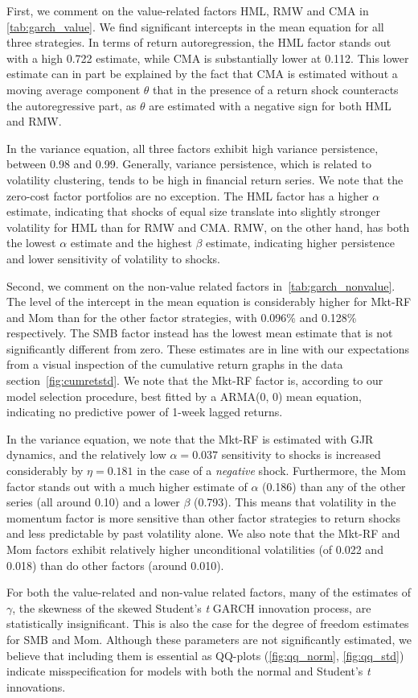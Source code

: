 First, we comment on the value-related factors HML, RMW and CMA in \autoref{tab:garch_value}. We find significant intercepts in the mean equation for all three strategies. In terms of return autoregression, the HML factor stands out with a high 0.722 estimate, while CMA is substantially lower at 0.112. This lower estimate can in part be explained by the fact that CMA is estimated without a moving average component $\theta$ that in the presence of a return shock counteracts the autoregressive part, as $\theta$ are estimated with a negative sign for both HML and RMW. 

In the variance equation, all three factors exhibit high variance persistence, between 0.98 and 0.99. Generally, variance persistence, which is related to volatility clustering, tends to be high in financial return series. We note that the zero-cost factor portfolios are no exception. The HML factor has a higher $\alpha$ estimate, indicating that shocks of equal size translate into slightly stronger volatility for HML than for RMW and CMA. RMW, on the other hand, has both the lowest $\alpha$ estimate and the highest $\beta$ estimate, indicating higher persistence and lower sensitivity of volatility to shocks.

Second, we comment on the non-value related factors in~\autoref{tab:garch_nonvalue}. The level of the intercept in the mean equation is considerably higher for Mkt-RF and Mom than for the other factor strategies, with 0.096\% and 0.128\% respectively. The SMB factor instead has the lowest mean estimate that is not significantly different from zero. These estimates are in line with our expectations from a visual inspection of the cumulative return graphs in the data section~\autoref{fig:cumretstd}. We note that the Mkt-RF factor is, according to our model selection procedure, best fitted by a ARMA(0, 0) mean equation, indicating no predictive power of 1-week lagged returns. 

In the variance equation, we note that the Mkt-RF is estimated with GJR dynamics, and the relatively low $\alpha = 0.037$ sensitivity to shocks is increased considerably by $\eta = 0.181$ in the case of a \emph{negative} shock. Furthermore, the Mom factor stands out with a much higher estimate of $\alpha$ (0.186) than any of the other series (all around 0.10) and a lower $\beta$ (0.793). This means that volatility in the momentum factor is more sensitive than other factor strategies to return shocks and less predictable by past volatility alone. We also note that the Mkt-RF and Mom factors exhibit relatively higher unconditional volatilities (of 0.022 and 0.018) than do other factors (around 0.010).

For both the value-related and non-value related factors, many of the estimates of $\gamma$, the skewness of the skewed Student's \textit{t} GARCH innovation process, are statistically insignificant. This is also the case for the degree of freedom estimates for SMB and Mom. Although these parameters are not significantly estimated, we believe that including them is essential as QQ-plots (\autoref{fig:qq_norm}, \autoref{fig:qq_std}) indicate misspecification for models with both the normal and Student's \textit{t} innovations.

